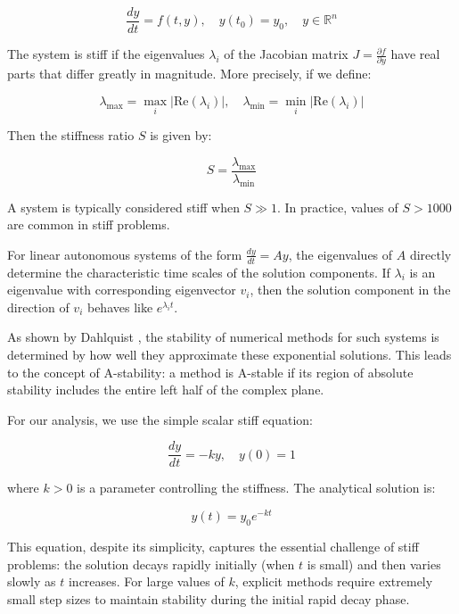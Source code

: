 \documentclass[11pt,a4paper]{article}
\begin{document}
\begin{equation}
\frac{dy}{dt} = f(t, y), \quad y(t_0) = y_0, \quad y \in \mathbb{R}^n
\end{equation}

The system is stiff if the eigenvalues $\lambda_i$ of the Jacobian matrix $J = \frac{\partial f}{\partial y}$ have real parts that differ greatly in magnitude. More precisely, if we define:

\begin{equation}
\lambda_{\max} = \max_{i} |\text{Re}(\lambda_i)|, \quad \lambda_{\min} = \min_{i} |\text{Re}(\lambda_i)|
\end{equation}

Then the stiffness ratio $S$ is given by:

\begin{equation}
S = \frac{\lambda_{\max}}{\lambda_{\min}}
\end{equation}

A system is typically considered stiff when $S \gg 1$. In practice, values of $S > 1000$ are common in stiff problems.

For linear autonomous systems of the form $\frac{dy}{dt} = Ay$, the eigenvalues of $A$ directly determine the characteristic time scales of the solution components. If $\lambda_i$ is an eigenvalue with corresponding eigenvector $v_i$, then the solution component in the direction of $v_i$ behaves like $e^{\lambda_i t}$.

As shown by Dahlquist \cite{dahlquist1963special}, the stability of numerical methods for such systems is determined by how well they approximate these exponential solutions. This leads to the concept of A-stability: a method is A-stable if its region of absolute stability includes the entire left half of the complex plane.

For our analysis, we use the simple scalar stiff equation:

\begin{equation}
\frac{dy}{dt} = -ky, \quad y(0) = 1
\end{equation}

where $k > 0$ is a parameter controlling the stiffness. The analytical solution is:

\begin{equation}
y(t) = y_0 e^{-kt}
\end{equation}

This equation, despite its simplicity, captures the essential challenge of stiff problems: the solution decays rapidly initially (when $t$ is small) and then varies slowly as $t$ increases. For large values of $k$, explicit methods require extremely small step sizes to maintain stability during the initial rapid decay phase.
\end{document}
